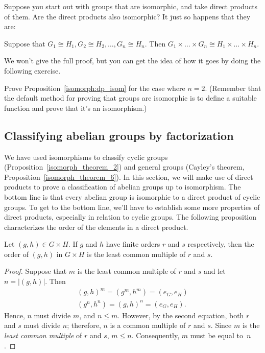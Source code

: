 Suppose you start out with groups that are isomorphic, and take direct products of them.  Are the direct products also isomorphic? It just so happens that they are:

\begin{thm}\label{isomorph:dp_isom}
Suppose that $G_1 \cong H_1, G_2 \cong H_2, \ldots, G_n \cong H_n$. Then $G_1 \times \ldots \times G_n  \cong H_1 \times \ldots \times H_n$.
\end{thm}

\noindent
We won't give the full proof, but you can get the idea of how it goes by doing the following exercise.

\begin{exercise}{}
Prove Proposition~\ref{isomorph:dp_isom} for the case where $n=2$. (Remember that the default method for proving that groups are isomorphic is to define a suitable function and prove that it's an isomorphism.)
\end{exercise}

\subsection{Classifying abelian groups by factorization}

We have used isomorphisms to classify cyclic groups (Proposition~\ref{isomorph_theorem_2}) and general groups (Cayley's theorem, Proposition~\ref{isomorph_theorem_6}). In this section, we will make use of direct products to prove a classification of abelian groups up to isomorphism. The bottom line is that every abelian group is isomorphic to a direct product of cyclic groups. To get to the bottom line, we'll have to establish some more properties of direct products, especially in relation to cyclic groups.  The following  proposition characterizes the order of the elements in a direct product.

\begin{thm}\label{isomorph:lcm_theorem}
Let $(g, h) \in G \times H$. If $g$ and $h$ have finite orders $r$ and
$s$ respectively, then the order of $(g, h)$ in $G \times H$ is the
least common multiple of $r$ and $s$. 
\end{thm}

 
\begin{proof}
Suppose that $m$ is the least common multiple of $r$ and $s$ and let
$n = |(g,h)|$. Then 
\begin{gather*}
(g,h)^m  = (g^m, h^m) = (e_G,e_H) \\
(g^n, h^n)  = (g, h)^n = (e_G,e_H).
\end{gather*}
Hence, $n$ must divide $m$, and $n \leq m$.  However, by the second
equation, both $r$ and $s$ must divide $n$; therefore, $n$ is a common
multiple of $r$ and $s$. Since $m$ is the {\em least common multiple\/}
of $r$ and $s$, $m \leq n$.  Consequently, $m$ must be equal to~$n$.
\end{proof}


